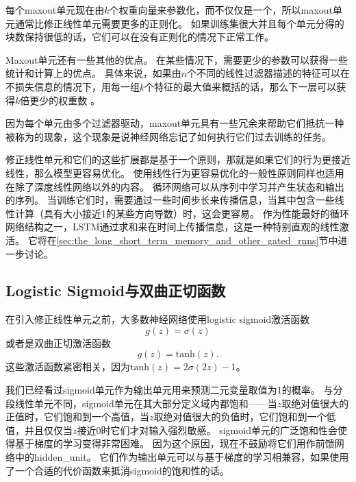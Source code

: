 每个maxout单元现在由$k$个权重向量来参数化，而不仅仅是一个，所以maxout单元通常比修正线性单元需要更多的正则化。
如果训练集很大并且每个单元分得的块数保持很低的话，它们可以在没有正则化的情况下正常工作\citep{cai2013deep}。

Maxout单元还有一些其他的优点。
在某些情况下，需要更少的参数可以获得一些统计和计算上的优点。
具体来说，如果由$n$个不同的线性过滤器描述的特征可以在不损失信息的情况下，用每一组$k$个特征的最大值来概括的话，那么下一层可以获得$k$倍更少的权重数 。

因为每个单元由多个过滤器驱动，maxout单元具有一些冗余来帮助它们抵抗一种被称为的现象，这个现象是说神经网络忘记了如何执行它们过去训练的任务\citep{Goodfellow+al-ICLR2014-small}。

修正线性单元和它们的这些扩展都是基于一个原则，那就是如果它们的行为更接近线性，那么模型更容易优化。
使用线性行为更容易优化的一般性原则同样也适用在除了深度线性网络以外的内容。
循环网络可以从序列中学习并产生状态和输出的序列。
当训练它们时，需要通过一些时间步长来传播信息，当其中包含一些线性计算（具有大小接近1的某些方向导数）时，这会更容易。
作为性能最好的循环网络结构之一，LSTM通过求和来在时间上传播信息，这是一种特别直观的线性激活。
它将在\ref{sec:the_long_short_term_memory_and_other_gated_rnns}节中进一步讨论。


\subsection{Logistic Sigmoid与双曲正切函数}
\label{sec:logistic_sigmoid_and_hyperbolic_tangent}

在引入修正线性单元之前，大多数神经网络使用logistic sigmoid激活函数
\begin{equation}
g(z) = \sigma(z)
\end{equation}
或者是双曲正切激活函数
\begin{equation}
g(z) = \text{tanh}(z).
\end{equation}
这些激活函数紧密相关，因为$\text{tanh}(z)=2\sigma(2z)-1$。

我们已经看过sigmoid单元作为输出单元用来预测二元变量取值为1的概率。
与分段线性单元不同，sigmoid单元在其大部分定义域内都饱和——当$z$取绝对值很大的正值时，它们饱和到一个高值，当$z$取绝对值很大的负值时，它们饱和到一个低值，并且仅仅当$z$接近0时它们才对输入强烈敏感。
sigmoid单元的广泛饱和性会使得基于梯度的学习变得非常困难。
因为这个原因，现在不鼓励将它们用作前馈网络中的\gls{hidden_unit}。
它们作为输出单元可以与基于梯度的学习相兼容，如果使用了一个合适的代价函数来抵消sigmoid的饱和性的话。

